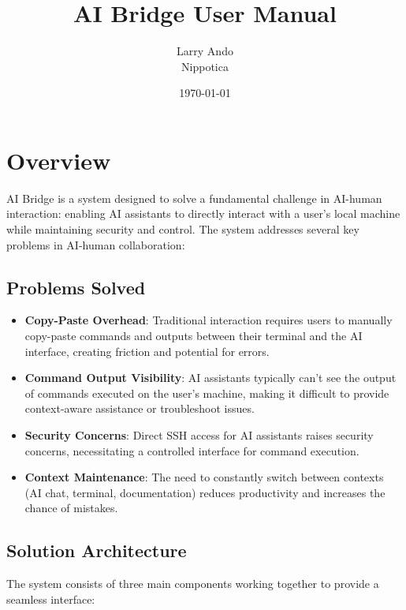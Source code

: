 \documentclass{article}
\title{AI Bridge User Manual}
\author{Larry Ando \\ Nippotica}
\date{\today}
\begin{document}
\maketitle

\section{Overview}
AI Bridge is a system designed to solve a fundamental challenge in AI-human interaction: enabling AI assistants to directly interact with a user's local machine while maintaining security and control. The system addresses several key problems in AI-human collaboration:

\subsection{Problems Solved}
\begin{itemize}
    \item \textbf{Copy-Paste Overhead}: Traditional interaction requires users to manually copy-paste commands and outputs between their terminal and the AI interface, creating friction and potential for errors.
    
    \item \textbf{Command Output Visibility}: AI assistants typically can't see the output of commands executed on the user's machine, making it difficult to provide context-aware assistance or troubleshoot issues.
    
    \item \textbf{Security Concerns}: Direct SSH access for AI assistants raises security concerns, necessitating a controlled interface for command execution.
    
    \item \textbf{Context Maintenance}: The need to constantly switch between contexts (AI chat, terminal, documentation) reduces productivity and increases the chance of mistakes.
\end{itemize}

\subsection{Solution Architecture}
The system consists of three main components working together to provide a seamless interface:
\end{document}
